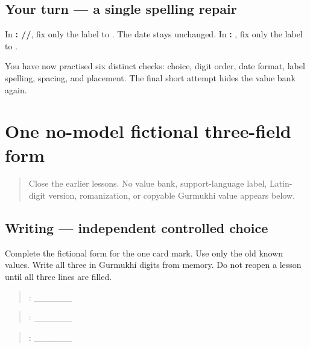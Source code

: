 \subsection*{Your turn — a single spelling repair}
In \textbf{: //}, fix only the label to \textbf{}. The date stays unchanged. In \textbf{:  }, fix only the label to \textbf{}.

\begin{tcolorbox}[breakable,colback=teal!4,colframe=teal!35!black,title={Before you move on}]
You have now practised six distinct checks: choice, digit order, date format, label spelling, spacing, and placement. The final short attempt hides the value bank again.
\end{tcolorbox}
\section[\texorpdfstring{\pa{ਉਮਰ}: · \pa{ਫ਼ੋਨ} … (independent …)}{ਉਮਰ: · ਫ਼ੋਨ … (independent …)}]{One no-model fictional three-field form}

\label{lesson:PA-W10-form-no-model}



\begin{quote}
Close the earlier lessons. No value bank, support-language label, Latin-digit version, romanization, or copyable Gurmukhi value appears below.
\end{quote}

\subsection*{Writing — independent controlled choice}
Complete the fictional form for the one card mark. Use only the old known values. Write all three in Gurmukhi digits from memory. Do not reopen a lesson until all three lines are filled.

\begin{quote}
\end{quote}

\begin{quote}
: \_\_\_\_\_\_
\end{quote}

\begin{quote}
: \_\_\_\_\_\_
\end{quote}

\begin{quote}
: \_\_\_\_\_\_
\end{quote}

